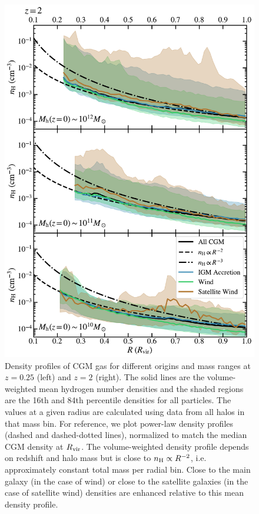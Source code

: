 \documentclass[fleqn,usenatbib]{mnras}
\begin{document}
\begin{figure}
\begin{minipage}{0.495\textwidth}
\includegraphics[width=\textwidth]{figures/CGM_den_profile_snum172.pdf}
\end{minipage} \hfill
\caption{
Density profiles of CGM gas for different origins and mass ranges at $z=0.25$ (left) and $z=2$ (right).
The solid lines are the volume-weighted mean hydrogen number densities and the shaded regions are the 16th and 84th percentile densities for all particles.
The values at a given radius are calculated using data from all halos in that mass bin.
For reference, we plot power-law density profiles (dashed and dashed-dotted lines), normalized to match the median CGM density at $R_{\rm vir}$.
The volume-weighted density profile depends on redshift and halo mass but is close to $n_{\rm H} \propto R^{-2}$, i.e. approximately constant total mass per radial bin.
Close to the main galaxy (in the case of wind) or close to the satellite galaxies (in the case of satellite wind) densities are enhanced relative to this mean density profile.
}
\label{fig:CGM_den_profile}
\end{figure}
\end{document}
